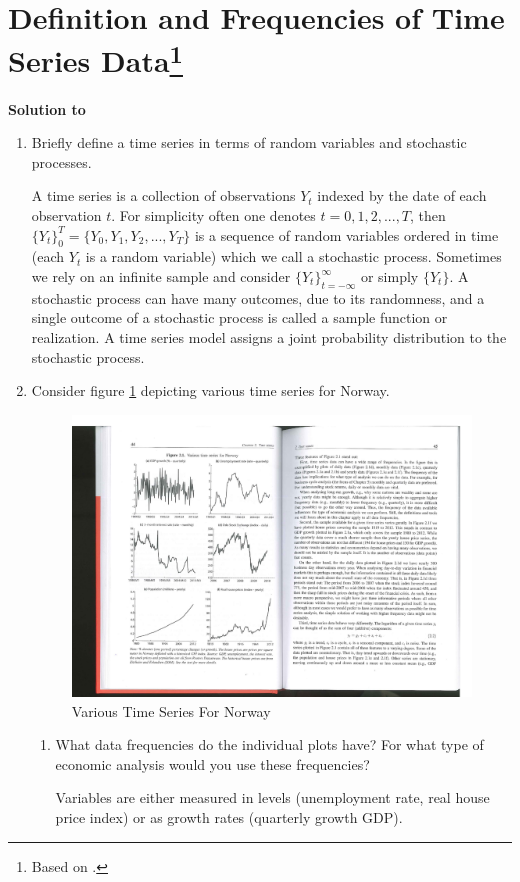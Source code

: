 \documentclass[a4paper]{scrartcl}
\begin{document}
\section[Definition and Frequencies of Time Series Data]{Definition and Frequencies of Time Series Data\footnote{Based on \citet[Ch.~2]{BjornlandThorsrud.2015}.}}\label{ex:DefFreqTS}
\begin{solution}\textbf{Solution to }
\end{solution}
\begin{enumerate}
	\item Briefly define a time series in terms of random variables and stochastic processes.	
	\begin{solution}
		A time series is a collection of observations $Y_t$ indexed by the date of each observation $t$. For simplicity often one denotes $t=0,1,2,...,T$, then $\{Y_t\}_0^T = \{Y_0,Y_1,Y_2,...,Y_T\}$ is a sequence of random variables ordered in time (each $Y_t$ is a random variable) which we call a stochastic process. Sometimes we rely on an infinite sample and consider $\{Y_t\}_{t=-\infty}^\infty$ or simply $\{Y_t\}$. A stochastic process can have many outcomes, due to its randomness, and a single outcome of a stochastic process is called a sample function or realization. A time series model assigns a joint probability distribution to the stochastic process.
	\end{solution}
	
	\item Consider figure \ref{fig:NorwayData} depicting various time series for Norway.
		\begin{figure}[h]
		\centering
		\includegraphics[width=0.6\linewidth]{NorwayDataOverview.pdf}
		\caption{Various Time Series For Norway}
		\label{fig:NorwayData}
		\end{figure}
	\begin{enumerate}
		\item What data frequencies do the individual plots have? For what type of economic analysis would you use these frequencies?
		\begin{solution}
			Variables are either measured in levels (unemployment rate, real house price index) or as growth rates (quarterly growth GDP).
			

\end{solution}
\end{enumerate}
\end{enumerate}
\end{document}
